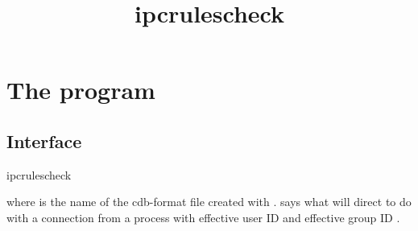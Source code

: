 \documentclass{book}
\title{ipcrulescheck}
\begin{document}
\section{The  program}

\subsection{Interface}
\begin{code}%
  ipcrulescheck 
\end{code}
where  is the name of the cdb-format file created with
.   says what  will direct
 to do with a connection from a process with effective
user ID  and effective group ID
.
\end{document}
